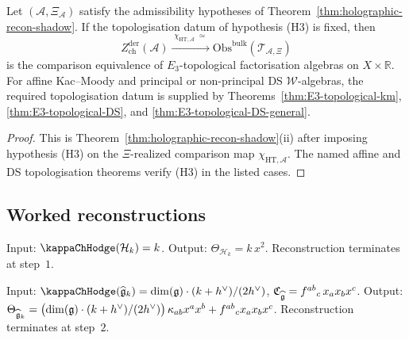 \begin{corollary}\label{thm:holographic-recon-e3}
Let \((\mathcal A,\Xi_{\mathcal A})\) satisfy the admissibility
hypotheses of Theorem~\ref{thm:holographic-recon-shadow}. If the
topologisation datum of hypothesis \textup{(H3)} is fixed, then
\[
Z^{\mathrm{der}}_{\mathrm{ch}}(\mathcal A)
\xrightarrow{\;\chi_{\mathrm{HT},\mathcal A}\;\simeq\;}
\mathrm{Obs}^{\mathrm{bulk}}(\mathcal T_{\mathcal A,\Xi})
\]
is the comparison equivalence of $E_3$-topological factorisation
algebras on
$X\times\mathbb R$. For affine Kac--Moody and principal or
non-principal DS $\mathcal W$-algebras, the required topologisation
datum is supplied by Theorems~\ref{thm:E3-topological-km},
\ref{thm:E3-topological-DS}, and
\ref{thm:E3-topological-DS-general}.
\end{corollary}
\begin{proof}
This is Theorem~\ref{thm:holographic-recon-shadow}\textup{(ii)}
after imposing hypothesis \textup{(H3)} on the \(\Xi\)-realized
comparison map \(\chi_{\mathrm{HT},\mathcal A}\). The named affine and
DS topologisation theorems verify \textup{(H3)} in the listed cases.
\end{proof}


\subsection{Worked reconstructions}

\begin{example}
Input: $\kappaChHodge(\mathcal{H}_k) = k$.
Output: $\Theta_{\mathcal{H}_k} = k\,x^2$.
Reconstruction terminates at step~$1$.
\end{example}

\begin{example}
Input: $\kappaChHodge(\widehat{\fg}_k) = \dim(\fg)\cdot(k+h^\vee)/(2h^\vee)$,
$\mathfrak{C}_{\widehat{\mathfrak{g}}} = f^{ab}{}_c\,x_a x_b x^c$.
Output:
$\Theta_{\widehat{\mathfrak{g}}_k} = \bigl(\dim(\mathfrak{g})\cdot(k+h^\vee)/(2h^\vee)\bigr)\,\kappa_{ab}x^a x^b
+ f^{ab}{}_c x_a x_b x^c$.
Reconstruction terminates at step~$2$.
\end{example}

